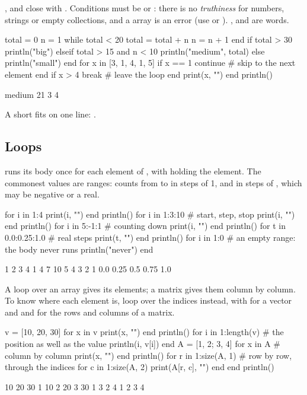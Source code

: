 \documentclass[11pt,a4paper,openany]{report}
\begin{document}
{{,  and  close with . Conditions must be
 or : there is no \emph{truthiness} for numbers, strings or
empty collections, and a  array is an error (use  or
). ,  and  are words.

\begin{axon}
total = 0
n = 1
while total < 20
  total = total + n
  n = n + 1
end
if total > 30
  println("big")
elseif total > 15 and n < 10
  println("medium", total)
else
  println("small")
end
for x in [3, 1, 4, 1, 5]
  if x == 1
    continue        # skip to the next element
  end
  if x > 4
    break           # leave the loop
  end
  print(x, "")
end
println()
\end{axon}
\begin{axonout}
medium 21
3 4
\end{axonout}

A short  fits on one line: .

\subsection{Loops}\label{sec:loops}

 runs its body once for each element of ,
with  holding the element. The commonest values are ranges:
 counts from  to  in steps of 1, and 
in steps of , which may be negative or a real.

\begin{axon}
for i in 1:4
  print(i, "")
end
println()
for i in 1:3:10          # start, step, stop
  print(i, "")
end
println()
for i in 5:-1:1          # counting down
  print(i, "")
end
println()
for t in 0.0:0.25:1.0    # real steps
  print(t, "")
end
println()
for i in 1:0             # an empty range: the body never runs
  println("never")
end
\end{axon}
\begin{axonout}
1 2 3 4
1 4 7 10
5 4 3 2 1
0.0 0.25 0.5 0.75 1.0
\end{axonout}

A loop over an array gives its elements; a matrix gives them column by
column. To know where each element is, loop over the indices instead, with
 for a vector and  and  for
the rows and columns of a matrix.

\begin{axon}
v = [10, 20, 30]
for x in v
  print(x, "")
end
println()
for i in 1:length(v)     # the position as well as the value
  println(i, v[i])
end
A = [1, 2; 3, 4]
for x in A               # column by column
  print(x, "")
end
println()
for r in 1:size(A, 1)    # row by row, through the indices
  for c in 1:size(A, 2)
    print(A[r, c], "")
  end
end
println()
\end{axon}
\begin{axonout}
10 20 30
1 10
2 20
3 30
1 3 2 4
1 2 3 4
\end{axonout}

}}
\end{document}
